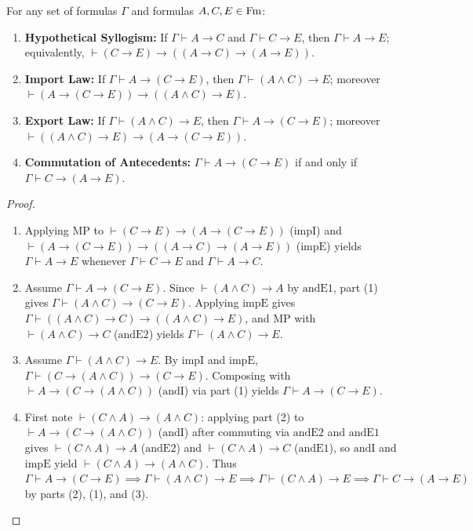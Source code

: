 \documentclass[10pt,a4paper]{article}
\renewcommand{\myprf}{\begin{proof}}
\renewcommand{\myqed}{\end{proof}}
\begin{document}
\begin{lemma}\label{lem:import_export}
For any set of formulas $\Gamma$ and formulas $A, C, E \in {\textrm{Fm}}$:
\begin{enumerate}
\item \textbf{Hypothetical Syllogism:} If $\Gamma \vdash A \to C$ and $\Gamma \vdash C \to E$, then $\Gamma \vdash A \to E$; equivalently, $\vdash (C \to E) \to ((A \to C) \to (A \to E))$.
\item \textbf{Import Law:} If $\Gamma \vdash A \to (C \to E)$, then $\Gamma \vdash (A \land C) \to E$; moreover $\vdash (A \to (C \to E)) \to ((A \land C) \to E)$.
\item \textbf{Export Law:} If $\Gamma \vdash (A \land C) \to E$, then $\Gamma \vdash A \to (C \to E)$; moreover $\vdash ((A \land C) \to E) \to (A \to (C \to E))$.
\item \textbf{Commutation of Antecedents:} $\Gamma \vdash A \to (C \to E)$ if and only if $\Gamma \vdash C \to (A \to E)$.
\end{enumerate}
\end{lemma}
\myprf
\begin{enumerate}
\item Applying $\textrm{MP}$ to $\vdash (C \to E) \to (A \to (C \to E))$ ($\textrm{impI}$) and $\vdash (A \to (C \to E)) \to ((A \to C) \to (A \to E))$ ($\textrm{impE}$) yields $\Gamma \vdash A \to E$ whenever $\Gamma \vdash C \to E$ and $\Gamma \vdash A \to C$.
\item Assume $\Gamma \vdash A \to (C \to E)$. Since $\vdash (A \land C) \to A$ by $\textrm{andE1}$, part (1) gives $\Gamma \vdash (A \land C) \to (C \to E)$. Applying $\textrm{impE}$ gives $\Gamma \vdash ((A \land C) \to C) \to ((A \land C) \to E)$, and $\textrm{MP}$ with $\vdash (A \land C) \to C$ ($\textrm{andE2}$) yields $\Gamma \vdash (A \land C) \to E$.
\item Assume $\Gamma \vdash (A \land C) \to E$. By $\textrm{impI}$ and $\textrm{impE}$, $\Gamma \vdash (C \to (A \land C)) \to (C \to E)$. Composing with $\vdash A \to (C \to (A \land C))$ ($\textrm{andI}$) via part (1) yields $\Gamma \vdash A \to (C \to E)$.
\item First note $\vdash (C \land A) \to (A \land C)$: applying part (2) to $\vdash A \to (C \to (A \land C))$ ($\textrm{andI}$) after commuting via $\textrm{andE2}$ and $\textrm{andE1}$ gives $\vdash (C \land A) \to A$ ($\textrm{andE2}$) and $\vdash (C \land A) \to C$ ($\textrm{andE1}$), so $\textrm{andI}$ and $\textrm{impE}$ yield $\vdash (C \land A) \to (A \land C)$. Thus $\Gamma \vdash A \to (C \to E) \implies \Gamma \vdash (A \land C) \to E \implies \Gamma \vdash (C \land A) \to E \implies \Gamma \vdash C \to (A \to E)$ by parts (2), (1), and (3).
\end{enumerate}
\myqed
\end{document}
